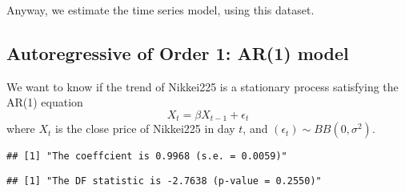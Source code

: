\documentclass[
  12pt,
]{article}
\newenvironment{Shaded}{\begin{snugshade}}{\end{snugshade}}
\newcommand{\DataTypeTok}[1]{\textcolor[rgb]{0.13,0.29,0.53}{#1}}
\newcommand{\DecValTok}[1]{\textcolor[rgb]{0.00,0.00,0.81}{#1}}
\newcommand{\KeywordTok}[1]{\textcolor[rgb]{0.13,0.29,0.53}{\textbf{#1}}}
\newcommand{\NormalTok}[1]{#1}
\newcommand{\OperatorTok}[1]{\textcolor[rgb]{0.81,0.36,0.00}{\textbf{#1}}}
\newcommand{\StringTok}[1]{\textcolor[rgb]{0.31,0.60,0.02}{#1}}
\begin{document}
Anyway, we estimate the time series model, using this dataset.

\hypertarget{autoregressive-of-order-1-ar1-model}{%
\subsection{Autoregressive of Order 1: AR(1)
model}\label{autoregressive-of-order-1-ar1-model}}

We want to know if the trend of Nikkei225 is a stationary process
satisfying the AR(1) equation \[ X_t = \beta X_{t-1} + \epsilon_t \]
where \(X_t\) is the close price of Nikkei225 in day \(t\), and
\((\epsilon_t) \sim BB(0, \sigma^2)\).

\begin{Shaded}
\end{Shaded}

\begin{verbatim}
## [1] "The coeffcient is 0.9968 (s.e. = 0.0059)"
\end{verbatim}

\begin{Shaded}
\end{Shaded}

\begin{verbatim}
## [1] "The DF statistic is -2.7638 (p-value = 0.2550)"
\end{verbatim}
\end{document}

